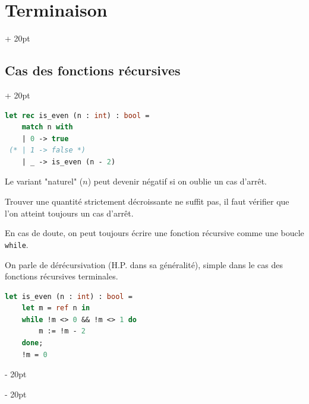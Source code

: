 \documentclass[a4paper, 12pt, twoside]{article}
\newcommand{\ind}[1][20pt]{\advance\leftskip + #1}
\newcommand{\deind}[1][20pt]{\advance\leftskip - #1}
\newenvironment{indentedenv}[1][20pt]{\par \ind[#1]}{\par \deind}
\newenvironment{indt}[2][20pt]{#2 \begin{indentedenv}[#1]}{\end{indentedenv}} %
\begin{document}
\begin{indt}{\section{Terminaison}}
        \begin{indt}{\subsection{Cas des fonctions récursives}}
            \begin{lstlisting}[language=Caml, xleftmargin=60pt]
let rec is_even (n : int) : bool =
    match n with
    | 0 -> true
 (* | 1 -> false *)
    | _ -> is_even (n - 2)\end{lstlisting}
            
            Le variant "naturel" ($n$) peut devenir négatif si on oublie un cas d'arrêt.
            
            Trouver une quantité strictement décroissante ne suffit pas, il faut vérifier que l'on atteint toujours un cas d'arrêt.
            
            \vspace{6pt}
            
            En cas de doute, on peut toujours écrire une fonction récursive comme une boucle \texttt{while}.
            
            On parle de dérécursivation (H.P. dans sa généralité), simple dans le cas des fonctions récursives terminales.
            
            \begin{lstlisting}[language=Caml, xleftmargin=60pt]
let is_even (n : int) : bool =
    let m = ref n in
    while !m <> 0 && !m <> 1 do
        m := !m - 2
    done;
    !m = 0
            \end{lstlisting}
        \end{indt}
        
    \end{indt}
    
    \vspace{12pt}
    
\end{document}
